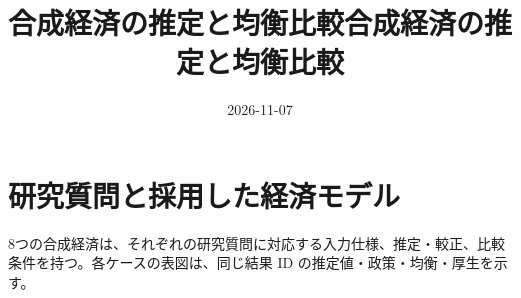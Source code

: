 \documentclass[ecta,nameyear,draft]{econsocart}
\begin{document}
\ifx\econselectedclass\econjournalclass
\begin{frontmatter}

\title{合成経済の推定と均衡比較}

\begin{aug}
%
%
%

\address[id=add1]{}

\support{}

%




\end{aug}

\end{frontmatter}
\else
\title{合成経済の推定と均衡比較}
\author{}
\date{2026-11-07}
\maketitle


\fi

\section{研究質問と採用した経済モデル}\label{data}

8つの合成経済は、それぞれの研究質問に対応する入力仕様、推定・較正、比較条件を持つ。各ケースの表図は、同じ結果
ID の推定値・政策・均衡・厚生を示す。
\end{document}
